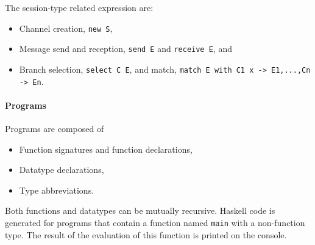 The session-type related expression are:
%
\begin{itemize}
\item Channel creation, \lstinline|new S|,
\item Message send and reception, \lstinline|send E| and
  \lstinline|receive E|, and
\item Branch selection, \lstinline|select C E|, and match,
  \lstinline|match E with C1 x -> E1,...,Cn -> En|.
\end{itemize}

\paragraph{Programs}

Programs are composed of
%
\begin{itemize}
\item Function signatures and function declarations, 
\item Datatype declarations,
\item Type abbreviations.
\end{itemize}

Both functions and datatypes can be mutually recursive. Haskell code
is generated for programs that contain a function named
\lstinline|main| with a non-function type. The result of the
evaluation of this function is printed on the console.

